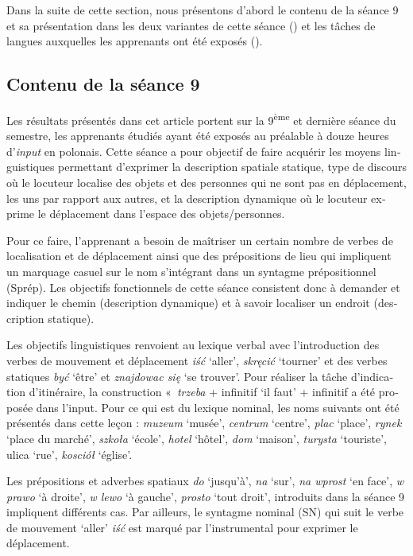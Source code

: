 \documentclass[output=paper]{langscibook}
\begin{document}
\begin{otherlanguage}{french}
Dans la suite de cette section, nous présentons d’abord le contenu de la séance 9 et sa présentation dans les deux variantes de cette séance () et les tâches de langues auxquelles les apprenants ont été exposés ().


\subsection{Contenu de la séance 9}\label{sec:watorek:4.3}

Les résultats présentés dans cet article portent sur la 9\textsuperscript{ème} et dernière séance du semestre, les apprenants étudiés ayant été exposés au préalable à douze heures d’\textit{input} en polonais. Cette séance a pour objectif de faire acquérir les moyens linguistiques permettant d’exprimer la description spatiale statique, type de discours où le locuteur localise des objets et des personnes qui ne sont pas en déplacement, les uns par rapport aux autres, et la description dynamique où le locuteur exprime le déplacement dans l’espace des objets/personnes. 

Pour ce faire, l’apprenant a besoin de maîtriser un certain nombre de verbes de localisation et de déplacement ainsi que des prépositions de lieu qui impliquent un marquage casuel sur le nom s’intégrant dans un syntagme prépositionnel (Sprép). Les objectifs fonctionnels de cette séance consistent donc à demander et indiquer le chemin (description dynamique) et à savoir localiser un endroit (description statique).

Les objectifs linguistiques renvoient au lexique verbal avec l’introduction des verbes de mouvement et déplacement \textit{iść} `aller', \textit{skręcić} `tourner' et des verbes statiques \textit{być} `être' et \textit{znajdowac się} `se trouver'. Pour réaliser la tâche d’indication d’itinéraire, la construction «~\textit{trzeba} + infinitif `il faut' + infinitif a été proposée dans l’input. Pour ce qui est du lexique nominal, les noms suivants ont été présentés dans cette leçon : \textit{muzeum} `musée', \textit{centrum} `centre', \textit{plac} `place', \textit{rynek} `place du marché', \textit{szkoła} `école', \textit{hotel} `hôtel', \textit{dom} `maison', \textit{turysta} `touriste', ulica `rue', \textit{kosciół} `église'.

Les prépositions et adverbes spatiaux \textit{do} `jusqu’à', \textit{na} `sur', \textit{na wprost} `en face', \textit{w prawo} `à droite', \textit{w lewo} `à gauche', \textit{prosto} `tout droit', introduits dans la séance 9 impliquent différents cas. Par ailleurs, le syntagme nominal (SN) qui suit le verbe de mouvement `aller' \textit{iść} est marqué par l’instrumental pour exprimer le déplacement.


\end{otherlanguage}
\end{document}
